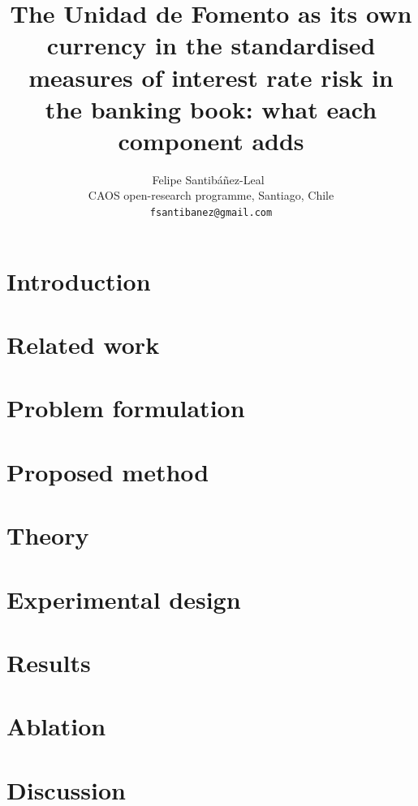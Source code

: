 \documentclass[11pt]{article}
\title{The Unidad de Fomento as its own currency in the standardised measures of interest rate risk in the banking book: what each component adds}
\author{Felipe Santib\'a\~nez-Leal~\orcidlink{0000-0002-0150-3246}\\
\small CAOS open-research programme, Santiago, Chile\\
\small \texttt{fsantibanez@gmail.com}}
\date{\docdate}
\begin{document}
\maketitle
\headerblock

\begin{abstract}

\end{abstract}

\section{Introduction}
\label{sec:introduction}


\section{Related work}
\label{sec:related-work}


\section{Problem formulation}
\label{sec:problem}


\section{Proposed method}
\label{sec:proposed-method}


\section{Theory}
\label{sec:theory}


\section{Experimental design}
\label{sec:experimental-design}


\section{Results}
\label{sec:results}


\section{Ablation}
\label{sec:ablation}


\section{Discussion}
\label{sec:discussion}

\end{document}
